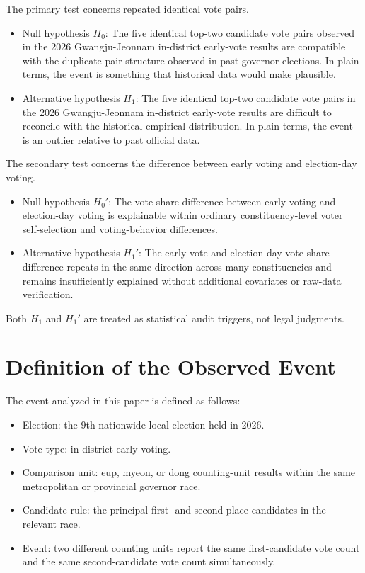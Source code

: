 \documentclass[preprint]{IEIE}
\begin{document}
The primary test concerns repeated identical vote pairs.

\begin{itemize}
\item Null hypothesis \(H_0\): The five identical top-two candidate vote pairs observed in the 2026 Gwangju-Jeonnam in-district early-vote results are compatible with the duplicate-pair structure observed in past governor elections. In plain terms, the event is something that historical data would make plausible.
\item Alternative hypothesis \(H_1\): The five identical top-two candidate vote pairs in the 2026 Gwangju-Jeonnam in-district early-vote results are difficult to reconcile with the historical empirical distribution. In plain terms, the event is an outlier relative to past official data.
\end{itemize}

The secondary test concerns the difference between early voting and election-day voting.

\begin{itemize}
\item Null hypothesis \(H_0'\): The vote-share difference between early voting and election-day voting is explainable within ordinary constituency-level voter self-selection and voting-behavior differences.
\item Alternative hypothesis \(H_1'\): The early-vote and election-day vote-share difference repeats in the same direction across many constituencies and remains insufficiently explained without additional covariates or raw-data verification.
\end{itemize}

Both \(H_1\) and \(H_1'\) are treated as statistical audit triggers, not legal judgments.

\section{Definition of the Observed Event}

The event analyzed in this paper is defined as follows:

\begin{itemize}
\item Election: the 9th nationwide local election held in 2026.
\item Vote type: in-district early voting.
\item Comparison unit: eup, myeon, or dong counting-unit results within the same metropolitan or provincial governor race.
\item Candidate rule: the principal first- and second-place candidates in the relevant race.
\item Event: two different counting units report the same first-candidate vote count and the same second-candidate vote count simultaneously.
\end{itemize}
\end{document}
